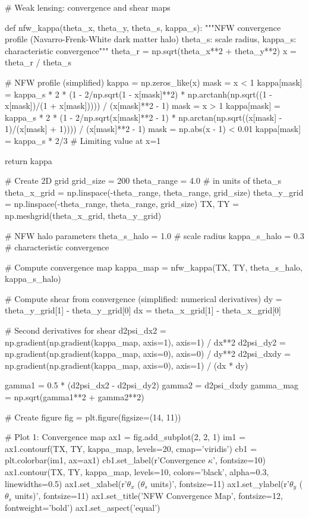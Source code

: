 \documentclass[11pt,a4paper]{article}
\begin{document}
\begin{pycode}
# Weak lensing: convergence and shear maps

def nfw_kappa(theta_x, theta_y, theta_s, kappa_s):
    """NFW convergence profile (Navarro-Frenk-White dark matter halo)
    theta_s: scale radius, kappa_s: characteristic convergence"""
    theta_r = np.sqrt(theta_x**2 + theta_y**2)
    x = theta_r / theta_s

    # NFW profile (simplified)
    kappa = np.zeros_like(x)
    mask = x < 1
    kappa[mask] = kappa_s * 2 * (1 - 2/np.sqrt(1 - x[mask]**2) *
                                 np.arctanh(np.sqrt((1 - x[mask])/(1 + x[mask])))) / (x[mask]**2 - 1)
    mask = x > 1
    kappa[mask] = kappa_s * 2 * (1 - 2/np.sqrt(x[mask]**2 - 1) *
                                 np.arctan(np.sqrt((x[mask] - 1)/(x[mask] + 1)))) / (x[mask]**2 - 1)
    mask = np.abs(x - 1) < 0.01
    kappa[mask] = kappa_s * 2/3  # Limiting value at x=1

    return kappa

# Create 2D grid
grid_size = 200
theta_range = 4.0  # in units of theta_s
theta_x_grid = np.linspace(-theta_range, theta_range, grid_size)
theta_y_grid = np.linspace(-theta_range, theta_range, grid_size)
TX, TY = np.meshgrid(theta_x_grid, theta_y_grid)

# NFW halo parameters
theta_s_halo = 1.0  # scale radius
kappa_s_halo = 0.3  # characteristic convergence

# Compute convergence map
kappa_map = nfw_kappa(TX, TY, theta_s_halo, kappa_s_halo)

# Compute shear from convergence (simplified: numerical derivatives)
dy = theta_y_grid[1] - theta_y_grid[0]
dx = theta_x_grid[1] - theta_x_grid[0]

# Second derivatives for shear
d2psi_dx2 = np.gradient(np.gradient(kappa_map, axis=1), axis=1) / dx**2
d2psi_dy2 = np.gradient(np.gradient(kappa_map, axis=0), axis=0) / dy**2
d2psi_dxdy = np.gradient(np.gradient(kappa_map, axis=0), axis=1) / (dx * dy)

gamma1 = 0.5 * (d2psi_dx2 - d2psi_dy2)
gamma2 = d2psi_dxdy
gamma_mag = np.sqrt(gamma1**2 + gamma2**2)

# Create figure
fig = plt.figure(figsize=(14, 11))

# Plot 1: Convergence map
ax1 = fig.add_subplot(2, 2, 1)
im1 = ax1.contourf(TX, TY, kappa_map, levels=20, cmap='viridis')
cb1 = plt.colorbar(im1, ax=ax1)
cb1.set_label(r'Convergence $\kappa$', fontsize=10)
ax1.contour(TX, TY, kappa_map, levels=10, colors='black', alpha=0.3, linewidths=0.5)
ax1.set_xlabel(r'$\theta_x$ ($\theta_s$ units)', fontsize=11)
ax1.set_ylabel(r'$\theta_y$ ($\theta_s$ units)', fontsize=11)
ax1.set_title('NFW Convergence Map', fontsize=12, fontweight='bold')
ax1.set_aspect('equal')


\end{pycode}
\end{document}
